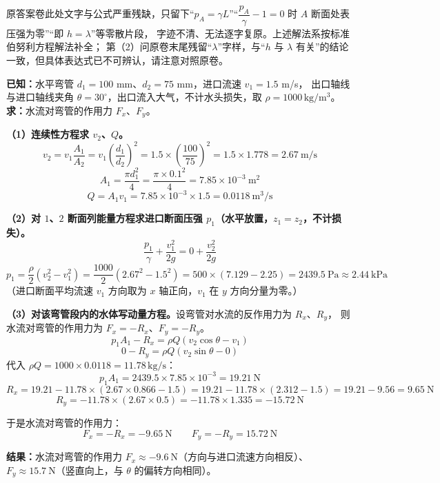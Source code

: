 \begin{tishi}
原答案卷此处文字与公式严重残缺，只留下“$p_A=\gamma L$”“$\dfrac{p_A}{\gamma}-1=0$ 时 $A$ 断面处表压强为零”“即 $h=\lambda$”等零散片段，
字迹不清、无法逐字复原。上述解法系按标准伯努利方程解法补全；
第（2）问原卷末尾残留“$\lambda$”字样，与“$h$ 与 $\lambda$ 有关”的结论一致，但具体表达式已不可辨认，请注意对照原卷。
\end{tishi}


\begin{jie}
\textbf{已知：}水平弯管 $d_1=100$ mm、$d_2=75$ mm，进口流速 $v_1=1.5$ m/s，
出口轴线与进口轴线夹角 $\theta=30^\circ$，出口流入大气，不计水头损失，取 $\rho=1000\,\mathrm{kg/m^3}$。
\textbf{求：}水流对弯管的作用力 $F_x$、$F_y$。

\textbf{（1）连续性方程求 $v_2$、$Q$。}
\[
v_2=v_1\frac{A_1}{A_2}=v_1\left(\frac{d_1}{d_2}\right)^2=1.5\times\left(\frac{100}{75}\right)^2
=1.5\times1.778=2.67\ \mathrm{m/s}
\]
\[
A_1=\frac{\pi d_1^2}{4}=\frac{\pi\times0.1^2}{4}=7.85\times10^{-3}\ \mathrm{m^2}
\]
\[
Q=A_1v_1=7.85\times10^{-3}\times1.5=0.0118\ \mathrm{m^3/s}
\]

\textbf{（2）对 $1$、$2$ 断面列能量方程求进口断面压强 $p_1$（水平放置，$z_1=z_2$，不计损失）。}
\[
\frac{p_1}{\gamma}+\frac{v_1^2}{2g}=0+\frac{v_2^2}{2g}
\]
\[
p_1=\frac{\rho}{2}\left(v_2^2-v_1^2\right)=\frac{1000}{2}\left(2.67^2-1.5^2\right)
=500\times(7.129-2.25)=2439.5\ \mathrm{Pa}\approx2.44\ \mathrm{kPa}
\]
（进口断面平均流速 $v_1$ 方向取为 $x$ 轴正向，$v_1$ 在 $y$ 方向分量为零。）

\textbf{（3）对该弯管段内的水体写动量方程。}设弯管对水流的反作用力为 $R_x$、$R_y$，
则水流对弯管的作用力为 $F_x=-R_x$、$F_y=-R_y$。
\[
p_1A_1-R_x=\rho Q\left(v_2\cos\theta-v_1\right)
\]
\[
0-R_y=\rho Q\left(v_2\sin\theta-0\right)
\]
代入 $\rho Q=1000\times0.0118=11.78\,\mathrm{kg/s}$：
\[
p_1A_1=2439.5\times7.85\times10^{-3}=19.21\ \mathrm{N}
\]
\[
R_x=19.21-11.78\times(2.67\times0.866-1.5)
=19.21-11.78\times(2.312-1.5)=19.21-9.56=9.65\ \mathrm{N}
\]
\[
R_y=-11.78\times(2.67\times0.5)=-11.78\times1.335=-15.72\ \mathrm{N}
\]

于是水流对弯管的作用力：
\[
F_x=-R_x=-9.65\ \mathrm{N}
\qquad
F_y=-R_y=15.72\ \mathrm{N}
\]

\textbf{结果：}水流对弯管的作用力
$\boxed{F_x\approx-9.6\ \mathrm{N}}$（方向与进口流速方向相反）、
$\boxed{F_y\approx15.7\ \mathrm{N}}$（竖直向上，与 $\theta$ 的偏转方向相同）。
\end{jie}

